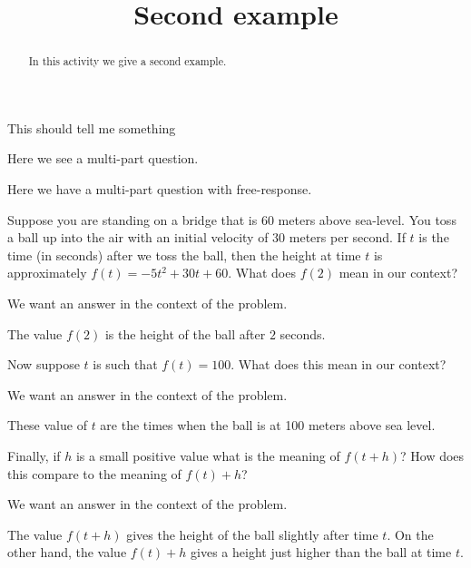 \documentclass[handout,instructornotes]{ximera}
\title{Second example}
\begin{document}
\begin{abstract}
In this activity we give a second example.
\end{abstract} 
\maketitle

\begin{instructorIntro}
  This should tell me something
\end{instructorIntro}

\begin{instructorNotes}
  Here we see a multi-part question.
\end{instructorNotes}

Here we have a multi-part question with free-response.

\begin{question} 
Suppose you are standing on a bridge that is 60 meters above
sea-level. You toss a ball up into the air with an initial velocity of
30 meters per second.  If $t$ is the time (in seconds) after we toss
the ball, then the height at time $t$ is approximately $f(t) = -5 t^2
+30t+60$. What does $f(2)$ mean in our context?
\begin{hint}
We want an answer in the context of the problem. 
\end{hint}
\begin{freeResponse}
The value $f(2)$ is the height of the ball after $2$ seconds.
\end{freeResponse}
Now suppose $t$ is such that $f(t) = 100$. What does this mean in our
context?
\begin{hint}
We want an answer in the context of the problem. 
\end{hint}
\begin{freeResponse}
These value of $t$ are the times when the ball is at 100 meters above sea level.\end{freeResponse}
Finally, if $h$ is a small positive value what is the meaning of
$f(t+h)$? How does this compare to the meaning of $f(t)+h$?
\begin{hint}
We want an answer in the context of the problem. 
\end{hint}
\begin{freeResponse}
The value $f(t+h)$ gives the height of the ball slightly after time
$t$. On the other hand, the value $f(t)+h$ gives a height just higher
than the ball at time $t$.
\end{freeResponse}
\end{question}
\end{document}
